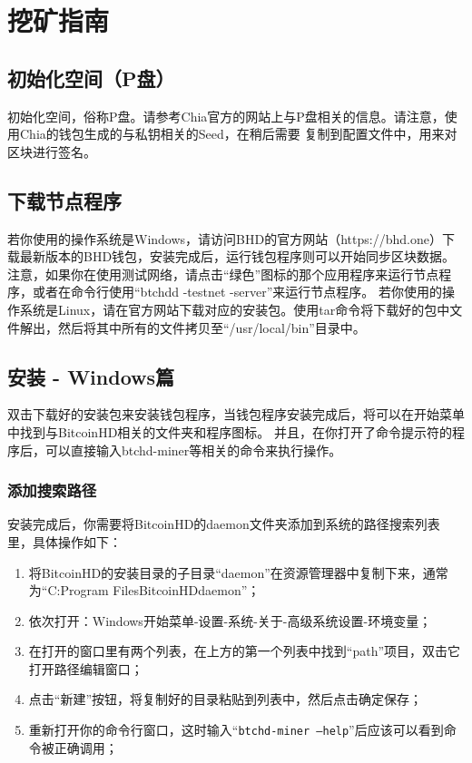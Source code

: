 \chapter{挖矿指南}
\section{初始化空间（P盘）}
\begin{flushleft}
    初始化空间，俗称P盘。请参考Chia官方的网站上与P盘相关的信息。请注意，使用Chia的钱包生成的与私钥相关的Seed，在稍后需要
    复制到配置文件中，用来对区块进行签名。
\end{flushleft}
\section{下载节点程序}
\begin{flushleft}
    若你使用的操作系统是Windows，请访问BHD的官方网站（https://bhd.one）下载最新版本的BHD钱包，安装完成后，运行钱包程序则可以开始同步区块数据。
    注意，如果你在使用测试网络，请点击``绿色''图标的那个应用程序来运行节点程序，或者在命令行使用``btchdd -testnet -server''来运行节点程序。
    若你使用的操作系统是Linux，请在官方网站下载对应的安装包。使用tar命令将下载好的包中文件解出，然后将其中所有的文件拷贝至``/usr/local/bin''目录中。
\end{flushleft}
\section{安装 - Windows篇}
\begin{flushleft}
    双击下载好的安装包来安装钱包程序，当钱包程序安装完成后，将可以在开始菜单中找到与BitcoinHD相关的文件夹和程序图标。
    并且，在你打开了命令提示符的程序后，可以直接输入btchd-miner等相关的命令来执行操作。
\end{flushleft}
\subsection{添加搜索路径}
\begin{flushleft}
    安装完成后，你需要将BitcoinHD的daemon文件夹添加到系统的路径搜索列表里，具体操作如下：
\end{flushleft}
\begin{enumerate}
    \item 将BitcoinHD的安装目录的子目录``daemon''在资源管理器中复制下来，通常为``C:Program FilesBitcoinHDdaemon''；
    \item 依次打开：Windows开始菜单-设置-系统-关于-高级系统设置-环境变量；
    \item 在打开的窗口里有两个列表，在上方的第一个列表中找到``path''项目，双击它打开路径编辑窗口；
    \item 点击``新建''按钮，将复制好的目录粘贴到列表中，然后点击确定保存；
    \item 重新打开你的命令行窗口，这时输入``\texttt{btchd-miner --help}''后应该可以看到命令被正确调用；
\end{enumerate}
